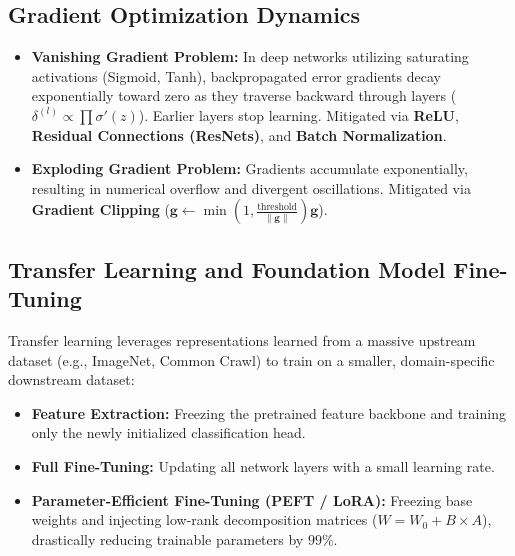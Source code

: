 \subsection{Gradient Optimization Dynamics}
\begin{itemize}
    \item \textbf{Vanishing Gradient Problem:} In deep networks utilizing saturating activations (Sigmoid, Tanh), backpropagated error gradients decay exponentially toward zero as they traverse backward through layers ($\delta^{(l)} \propto \prod \sigma'(z)$). Earlier layers stop learning. Mitigated via \textbf{ReLU}, \textbf{Residual Connections (ResNets)}, and \textbf{Batch Normalization}.
    \item \textbf{Exploding Gradient Problem:} Gradients accumulate exponentially, resulting in numerical overflow and divergent oscillations. Mitigated via \textbf{Gradient Clipping} ($\mathbf{g} \leftarrow \min\left(1, \frac{\text{threshold}}{\|\mathbf{g}\|}\right) \mathbf{g}$).
\end{itemize}

\subsection{Transfer Learning and Foundation Model Fine-Tuning}
Transfer learning leverages representations learned from a massive upstream dataset (e.g., ImageNet, Common Crawl) to train on a smaller, domain-specific downstream dataset:
\begin{itemize}
    \item \textbf{Feature Extraction:} Freezing the pretrained feature backbone and training only the newly initialized classification head.
    \item \textbf{Full Fine-Tuning:} Updating all network layers with a small learning rate.
    \item \textbf{Parameter-Efficient Fine-Tuning (PEFT / LoRA):} Freezing base weights and injecting low-rank decomposition matrices ($W = W_0 + B \times A$), drastically reducing trainable parameters by $99\%$.
\end{itemize}

